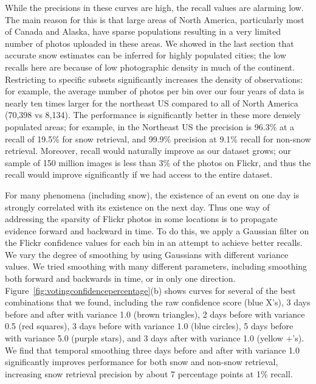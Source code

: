 While the precisions in these curves are high, the recall values are
alarming low. The main reason for this is that large areas of North
America, particularly most of Canada and Alaska, have sparse
populations resulting in a very limited number of photos uploaded in
these areas. We showed in the last section that accurate snow
estimates can be inferred for highly populated cities; the low recalls
here are because of low photographic density in much of the continent.
Restricting to specific subsets significantly increases the density of
observations: for example, the average number of photos per bin over
our four years of data is nearly ten times larger for the northeast US
compared to all of North America (70,398 vs 8,134).  The performance
is significantly better in these more densely populated areas; for
example, in the Northeast US the precision is 96.3\% at a recall of
19.5\% for snow retrieval, and 99.9\% precision at 9.1\% recall for
non-snow retrieval.  Moreover, recall would naturally improve as our
dataset grows; our sample of 150 million images is less than 3\% of
the photos on Flickr, and thus the recall would improve significantly
if we had access to the entire dataset.

  For many phenomena (including snow), the
existence of an event on one day is strongly correlated with its
existence on the next day. Thus one way of addressing the sparsity of
Flickr photos in some locations is to propagate evidence forward and
backward in time.  To do this, we apply a Gaussian filter on the Flickr
confidence values for each bin in an attempt to achieve better
recalls. We vary the degree of smoothing by using Gaussians with
different variance values. 
We tried smoothing with many
different parameters, including smoothing both forward and backwards
in time, or in only one direction.
Figure~\ref{fig:votingconfidencepercentage}(b) shows curves for
several of the best combinations that we found, including the raw
confidence score (blue X's), 3 days before and after with variance 1.0
(brown triangles), 2 days before with variance 0.5 (red squares), 3 days
before with variance 1.0 (blue circles), 5 days before with variance 5.0
(purple stars), and 3 days after with variance 1.0 (yellow +'s). We find
that temporal smoothing three days before and after with variance 1.0
significantly improves performance for both snow and non-snow
retrieval, increasing snow retrieval precision by about 7 percentage
points at 1\% recall.

